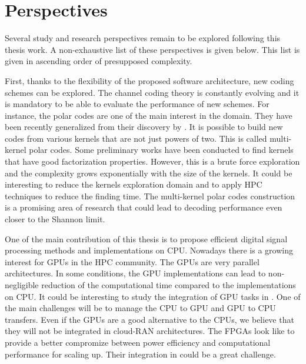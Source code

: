 \section*{Perspectives}

Several study and research perspectives remain to be explored following this
thesis work. A non-exhaustive list of these perspectives is given below. This
list is given in ascending order of presupposed complexity.

First, thanks to the flexibility of the proposed software architecture, new
coding schemes can be explored. The channel coding theory is constantly evolving
and it is mandatory to be able to evaluate the performance of new schemes. For
instance, the polar codes are one of the main interest in the domain. They have
been recently generalized from their discovery by \Arikan. It is possible to
build new codes from various kernels that are not just powers of two. This is
called multi-kernel polar codes. Some preliminary works have been conducted to
find kernels that have good factorization properties. However, this is a brute
force exploration and the complexity grows exponentially with the size of the
kernels. It could be interesting to reduce the kernels exploration domain and to
apply HPC techniques to reduce the finding time. The multi-kernel polar codes
construction is a promising area of research that could lead to decoding
performance even closer to the Shannon limit.

One of the main contribution of this thesis is to propose efficient digital
signal processing methods and implementations on CPU. Nowadays there is a
growing interest for GPUs in the HPC community. The GPUs are very parallel
architectures. In some conditions, the GPU implementations can lead to
non-negligible reduction of the computational time compared to the
implementations on CPU. It could be interesting to study the integration of
GPU tasks in \AFFECT. One of the main challenges will be to manage the CPU to
GPU and GPU to CPU transfers. Even if the GPUs are a good alternative to the
CPUs, we believe that they will not be integrated in cloud-RAN architectures.
The FPGAs look like to provide a better compromize between power efficiency and
computational performance for scaling up. Their integration in \AFFECT could be
a great challenge.

